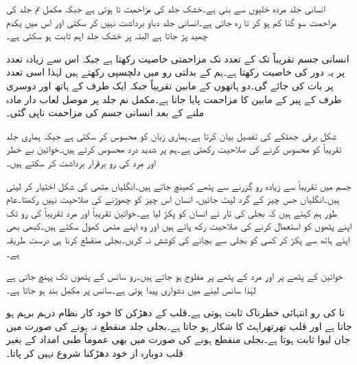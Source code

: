 انسانی جلد مردہ خلیوں سے بنی ہے۔خشک جلد کی مزاحمت  تا  ہوتی ہے جبکہ مکمل نم جلد کی مزاحمت سو گنا کم ہو کر  تا  رہ جاتی ہے۔انسانی جلد  دباو برداشت نہیں کر سکتی اور اس میں یکدم چھید پڑ جاتا ہے البتہ   پر خشک جلد اہم ثابت ہو سکتی ہے۔

انسانی جسم تقریباً  تک کے تعدد تک مزاحمتی خاصیت رکھتا ہے جبکہ اس سے زیادہ تعدد پر یہ  دور کی خاصیت رکھتا ہے۔ہم  کے بدلتی رو میں دلچسپی رکھتے ہیں لہٰذا اسی تعدد پر بات کی جائے گی۔دو ہاتھوں کے مابین تقریباً  جبکہ ایک طرف کے ہاتھ اور دوسری طرف کے پیر کے مابین  کا مزاحمت پایا جاتا ہے۔مکمل نم جلد پر موصل لعاب دار مادہ ملنے کے بعد انسانی جسم کی مزاحمت ناپی گئی۔  

شکل  برقی جھٹکے کی تفصیل بیان کرتا ہے۔ہماری زبان  کو محسوس کر سکتی ہے جبکہ ہماری جلد تقریباً  کو محسوس کرنے کی صلاحیت رکھتی ہے۔ہم  پر شدید درد محسوس کرتے ہیں۔خواتین بے خطر   اور مرد  کی رو برقرار برداشت کر سکتے ہیں۔

جسم میں تقریباً  سے زیادہ رو گزرنے سے پٹھے کھینچ جاتے ہیں۔انگلیاں مٹھی  کی شکل اختیار کر لیتی ہیں۔انگلیاں جس چیز کے گرد لپٹ جائیں، انسان اس چیز کو چھوڑنے کی صلاحیت نہیں رکھتا۔عام طور ہم کہتے ہیں کہ بجلی کی تار نے انسان کو پکڑ لیا ہے۔خواتین تقریباً  اور مرد تقریباً  کی رو تک اپنے پٹھوں کو استعمال کرنے کی صلاحیت رکھ پاتے ہیں اور وہ اپنے مٹھی کھول سکتے ہیں۔کبھی بھی اپنے  ہاتھ سے پکڑ کر کسی کو بجلی سے بچانے کی کوشش نہ کریں۔بجلی منقطع کرنا ہی درست طریقہ ہے۔

خواتین کے پٹھے  پر اور مرد کے پٹھے  پر مفلوج ہو جاتے ہیں۔رو سانس کے پٹھوں تک پہنچ جاتی ہے لہٰذا سانس لینے میں دشواری پیدا ہوتی ہے۔سانس  پر مکمل بند ہو جاتا ہے۔

 تا  کی رو انتہائی خطرناک ثابت ہوتی ہے۔قلب کے دھڑکن کا خود کار نظام درہم برہم ہو جاتا ہے اور قلب تھرتھراہٹ کا شکار ہو جاتا ہے۔بجلی جلد منقطع نہ ہونے کی صورت میں جان لیوا ثابت ہوتا ہے۔بجلی منقطع ہونے کی صورت میں بھی عموماً طبی امداد کے بغیر قلب دوبارہ از خود دھڑکنا شروع نہیں کر پاتا۔

